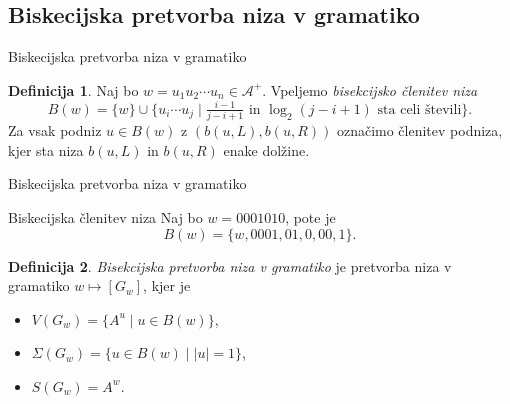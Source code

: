 \documentclass{beamer}
\newcommand{\A}{\mathcal{A}}
\theoremstyle{definition}
\newtheorem{definicija}{Definicija}[section]
\begin{document}
\subsection{Biskecijska pretvorba niza v gramatiko}

\begin{frame}{Biskecijska pretvorba niza v gramatiko}
    \begin{definicija}
        Naj bo $ w = u_1 u_2 \cdots u_n \in \A^+ $.
        Vpeljemo \textit{bisekcijsko členitev niza}
        \[
            B(w) = \{ w \} \cup \{ u_i \cdots u_j \mid \tfrac{i-1}{j-i+1} \text{ in } \log_2{(j-i+1)} \text{ sta celi števili}  \}.
        \]
        \pause
        Za vsak podniz $ u \in B(w) $ z $ ( b(u, L), b(u,R) )$ označimo členitev podniza, kjer sta niza $ b(u, L) $ in $ b(u,R) $ enake dolžine.
    \end{definicija}
\end{frame}

\begin{frame}{Biskecijska pretvorba niza v gramatiko}
    \begin{exampleblock}{Biskecijska členitev niza}
        Naj bo $w = 0001010 $, pote je
        \[
            B(w) = \{ w, 0001, 01, 0, 00, 1 \}.
        \]
    \end{exampleblock}
\end{frame}

\begin{frame}{}
    \begin{definicija}
        \textit{Bisekcijska pretvorba niza v gramatiko} je pretvorba niza v gramatiko $ w \mapsto [G_{w}] $, kjer je
        \begin{itemize}
            \item<2-> $ V(G_{w}) = \{ A^u \mid u \in B(w) \} $,
            \item<3-> $ \Sigma(G_{w}) = \{ u \in B(w) \mid |u| = 1 \} $,
            \item<4-> $ S(G_{w}) = A^{w} $.
        \end{itemize}
    \end{definicija}
\end{frame}
\end{document}
